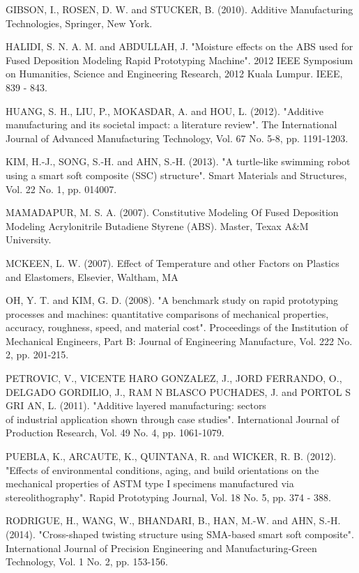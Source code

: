 \documentclass[10pt]{article}
\begin{document}
GIBSON, I., ROSEN, D. W. and STUCKER, B. (2010). Additive Manufacturing Technologies, Springer, New York.

HALIDI, S. N. A. M. and ABDULLAH, J. "Moisture effects on the ABS used for Fused Deposition Modeling Rapid Prototyping Machine". 2012 IEEE Symposium on Humanities, Science and Engineering Research, 2012 Kuala Lumpur. IEEE, 839 - 843.

HUANG, S. H., LIU, P., MOKASDAR, A. and HOU, L. (2012). "Additive manufacturing and its societal impact: a literature review". The International Journal of Advanced Manufacturing Technology, Vol. 67 No. 5-8, pp. 1191-1203.

KIM, H.-J., SONG, S.-H. and AHN, S.-H. (2013). "A turtle-like swimming robot using a smart soft composite (SSC) structure". Smart Materials and Structures, Vol. 22 No. 1, pp. 014007.

MAMADAPUR, M. S. A. (2007). Constitutive Modeling Of Fused Deposition Modeling Acrylonitrile Butadiene Styrene (ABS). Master, Texax A\&M University.

MCKEEN, L. W. (2007). Effect of Temperature and other Factors on Plastics and Elastomers, Elsevier, Waltham, MA

OH, Y. T. and KIM, G. D. (2008). "A benchmark study on rapid prototyping processes and machines: quantitative comparisons of mechanical properties, accuracy, roughness, speed, and material cost". Proceedings of the Institution of Mechanical Engineers, Part B: Journal of Engineering Manufacture, Vol. 222 No. 2, pp. 201-215.

PETROVIC, V., VICENTE HARO GONZALEZ, J., JORD FERRANDO, O., DELGADO GORDILlO, J., RAM N BLASCO PUCHADES, J. and PORTOL S GRI AN, L. (2011). "Additive layered manufacturing: sectors\\
of industrial application shown through case studies". International Journal of Production Research, Vol. 49 No. 4, pp. 1061-1079.

PUEBLA, K., ARCAUTE, K., QUINTANA, R. and WICKER, R. B. (2012). "Effects of environmental conditions, aging, and build orientations on the mechanical properties of ASTM type I specimens manufactured via stereolithography". Rapid Prototyping Journal, Vol. 18 No. 5, pp. 374 - 388.

RODRIGUE, H., WANG, W., BHANDARI, B., HAN, M.-W. and AHN, S.-H. (2014). "Cross-shaped twisting structure using SMA-based smart soft composite". International Journal of Precision Engineering and Manufacturing-Green Technology, Vol. 1 No. 2, pp. 153-156.
\end{document}
